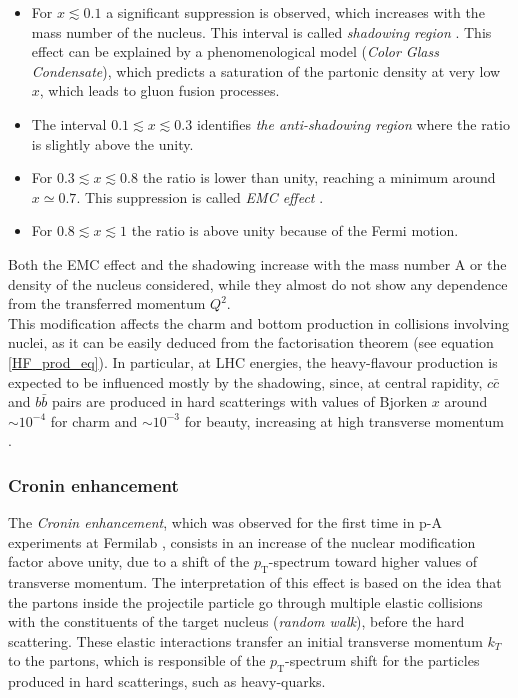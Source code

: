 \documentclass[b5paper,10pt,twoside,oldstyle,classica]{toptesi}
\newcommand{\pt}{p_\text{T}}
\begin{document}
\begin{itemize}
 \item For $x\lesssim 0.1$ a significant suppression is observed, which increases with the mass number of the nucleus. This interval is called \textit{shadowing region} \cite{Armesto:2006ph}. This effect can be explained by a phenomenological model (\textit{Color Glass Condensate}), which predicts a saturation of the partonic density at very low $x$, which leads to gluon fusion processes.    
\item The interval $0.1 \lesssim x \lesssim 0.3$ identifies \textit{the anti-shadowing region} where the ratio is slightly above the unity. 
 \item For $0.3 \lesssim x \lesssim 0.8$ the ratio is lower than unity, reaching a minimum around $x\simeq 0.7$. This suppression is called \textit{EMC effect} \cite{Rith:2014tma}.
 \item For $0.8 \lesssim x\lesssim 1$ the ratio is above unity because of the Fermi motion. 
\end{itemize}
Both the EMC effect and the shadowing increase with the mass number A or the density of the nucleus considered, while they almost do not show any dependence from the transferred momentum $Q^2$.\\ 
This modification affects the charm and bottom production in collisions involving nuclei, as it can be easily deduced from the factorisation theorem (see equation \ref{HF_prod_eq}). In particular, at LHC energies, the heavy-flavour production is expected to be influenced mostly by the shadowing, since, at central rapidity, $c\bar{c}$ and $b\bar{b}$ pairs are produced in hard scatterings with values of Bjorken $x$ around $\sim 10^{-4}$ for charm and $\sim 10^{-3}$ for beauty, increasing at high transverse momentum \cite{Carrer:2003ac}.
\subsubsection{Cronin enhancement}
The \textit{Cronin enhancement}, which was observed for the first time in p-A experiments at Fermilab \cite{Antreasyan:1978cw}, consists in an increase of the nuclear modification factor above unity, due to a shift of the $\pt$-spectrum toward higher values of transverse momentum. The interpretation of this effect is based on the idea that the partons inside the projectile particle go through multiple elastic collisions with the constituents of the target nucleus (\textit{random walk}), before the hard scattering. These elastic interactions transfer an initial transverse momentum $k_T$ to the partons, which is responsible of the $\pt$-spectrum shift for the particles produced in hard scatterings, such as heavy-quarks. 
\end{document}
